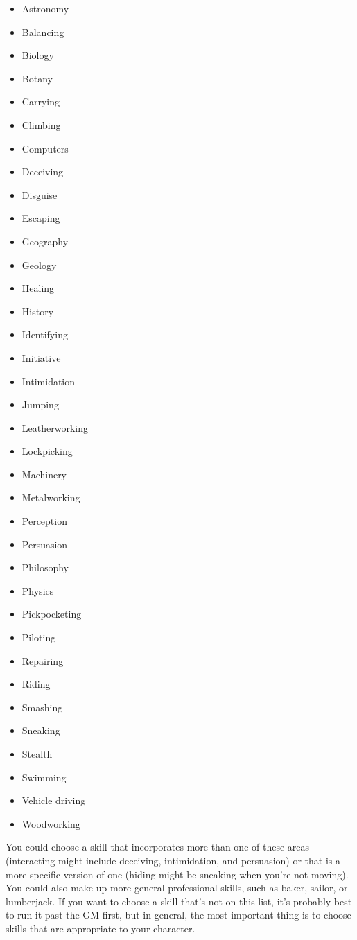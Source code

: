 \begin{multicols}{2}
\begin{itemize}
\item Astronomy
\item Balancing
\item Biology
\item Botany
\item Carrying
\item Climbing
\item Computers
\item Deceiving
\item Disguise
\item Escaping
\item Geography
\item Geology
\item Healing
\item History
\item Identifying
\item Initiative
\item Intimidation
\item Jumping
\item Leatherworking
\item Lockpicking
\item Machinery
\item Metalworking
\item Perception
\item Persuasion
\item Philosophy
\item Physics
\item Pickpocketing
\item Piloting
\item Repairing
\item Riding
\item Smashing
\item Sneaking
\item Stealth
\item Swimming
\item Vehicle driving
\item Woodworking 
\end{itemize}

You could choose a skill that incorporates more than one of these areas (interacting might include deceiving, intimidation, and persuasion) or that is a more specific version of one (hiding might be sneaking when you’re not moving). You could also make up more general professional skills, such as baker, sailor, or lumberjack. If you want to choose a skill that’s not on this list, it’s probably best to run it past the GM first, but in general, the most important thing is to choose skills that are appropriate to your character.


\end{multicols}
